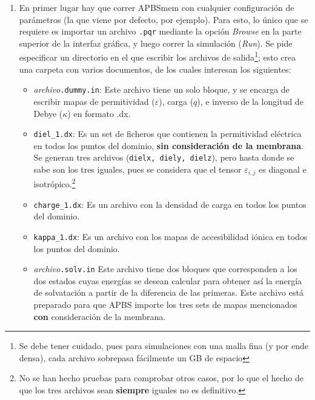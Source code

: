 \begin{enumerate}
	\item En primer lugar hay que correr APBSmem con cualquier configuración de parámetros (la que viene por defecto, por ejemplo). Para esto, lo único que se requiere es importar un archivo \texttt{.pqr} mediante la opción \textit{Browse} en la parte superior de la interfaz gráfica, y luego correr la simulación (\textit{Run}). Se pide especificar un directorio en el que escribir los archivos de salida\footnote{Se debe tener cuidado, pues para simulaciones con una malla fina (y por ende densa), cada archivo sobrepasa fácilmente un GB de espacio}; esto crea una carpeta con varios documentos, de los cuales interesan los siguientes:
	\begin{itemize}
		\item \textit{archivo}\texttt{.dummy.in}: Este archivo tiene un solo bloque, y se encarga de escribir mapas de permitividad ($\varepsilon$), carga ($q$), e inverso de la longitud de Debye ($\kappa$) en formato .dx.
		\item \texttt{diel\_1.dx}: Es un set de ficheros que contienen la permitividad eléctrica en todos los puntos del dominio, \textbf{sin consideración de la membrana}. Se generan tres archivos (\texttt{dielx, diely, dielz}), pero hasta donde se sabe son los tres iguales, pues se considera que el tensor $\varepsilon_{i,j}$ es diagonal e isotrópico.\footnote{No se han hecho pruebas para comprobar otros casos, por lo que el hecho de que los tres archivos sean \textbf{siempre} iguales no es definitivo.}
		\item \texttt{charge\_1.dx}: Es un archivo con la densidad de carga en todos los puntos del dominio.
		\item \texttt{kappa\_1.dx}: Es un archivo con los mapas de accesibilidad iónica en todos los puntos del dominio.
		\item \textit{archivo}\texttt{.solv.in} Este archivo tiene dos bloques que corresponden a los dos estados cuyas energías se desean calcular para obtener así la energía de solvatación a partir de la diferencia de las primeras. Este archivo está preparado para que APBS importe los tres sets de mapas mencionados \textbf{con} consideración de la membrana.
	\end{itemize}

\end{enumerate}
